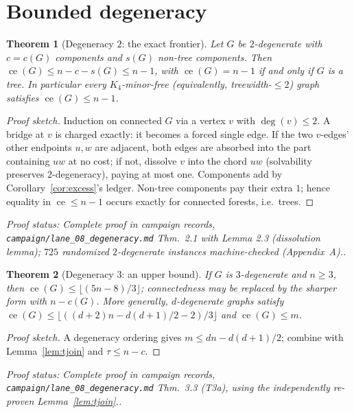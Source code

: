 \documentclass[a4paper,11pt]{amsart}
\newtheorem{theorem}{Theorem}[section]
\theoremstyle{definition}
\theoremstyle{remark}
\newcommand{\ce}{\operatorname{ce}}
\newcommand{\proofsrc}[1]{\par\smallskip\noindent\begin{sloppypar}\small\emph{Proof status: #1.}\end{sloppypar}\par\smallskip}
\begin{document}
\section{Bounded degeneracy}\label{sec:degeneracy}

\begin{theorem}[Degeneracy $2$: the exact frontier]\label{thm:deg2}
Let $G$ be $2$-degenerate with $c=c(G)$ components and $s(G)$ non-tree components. Then
$\ce(G)\le n-c-s(G)\le n-1$, with $\ce(G)=n-1$ if and only if $G$ is a tree. In particular every
$K_4$-minor-free (equivalently, treewidth-$\le2$) graph satisfies $\ce(G)\le n-1$.
\end{theorem}
\begin{proof}[Proof sketch]
Induction on connected $G$ via a vertex $v$ with $\deg(v)\le2$. A bridge at $v$ is charged exactly: it
becomes a forced single edge. If the two $v$-edges' other endpoints $u,w$ are adjacent, both edges are
absorbed into the part containing $uw$ at no cost; if not, dissolve $v$ into the chord $uw$ (solvability
preserves $2$-degeneracy), paying at most one. Components add by Corollary~\ref{cor:excess}'s ledger.
Non-tree components pay their extra $1$; hence equality in $\ce\le n-1$ occurs exactly for connected
forests, i.e.\ trees.
\end{proof}
\proofsrc{Complete proof in campaign records, \texttt{campaign/lane\_08\_degeneracy.md} Thm.~2.1 with
Lemma 2.3 (dissolution lemma); $725$ randomized $2$-degenerate instances machine-checked (Appendix~A).}

\begin{theorem}[Degeneracy $3$: an upper bound]\label{thm:deg3ub}
If $G$ is $3$-degenerate and $n\ge3$, then $\ce(G)\le\lfloor(5n-8)/3\rfloor$; connectedness may be replaced
by the sharper form with $n-c(G)$. More generally, $d$-degenerate graphs satisfy
$\ce(G)\le\lfloor((d+2)n-d(d+1)/2-2)/3\rfloor$ and $\ce(G)\le m$.
\end{theorem}
\begin{proof}[Proof sketch]
A degeneracy ordering gives $m\le dn-d(d+1)/2$; combine with Lemma~\ref{lem:tjoin} and $\tau\le n-c$.
\end{proof}
\proofsrc{Complete proof in campaign records, \texttt{campaign/lane\_08\_degeneracy.md} Thm.~3.3 (T3a),
using the independently re-proven Lemma~\ref{lem:tjoin}.}
\end{document}
